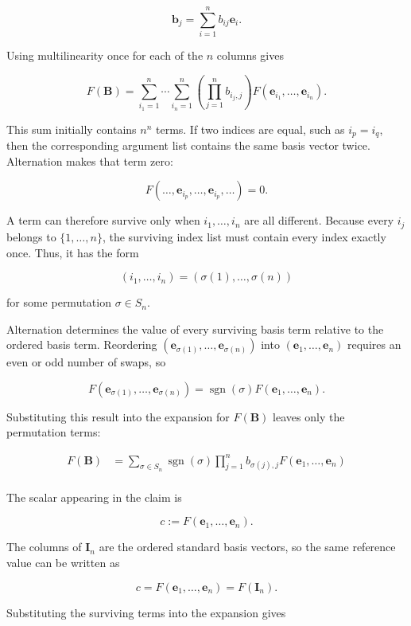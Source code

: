 \documentclass[
  australian,
  12pt,
  letterpaper,
  DIV=11,
  numbers=noendperiod,
  twoside]{scrreprt}
\begin{document}
\[
\mathbf b_j=\sum_{i=1}^{n}b_{ij}\mathbf e_i.
\]

Using multilinearity once for each of the \(n\) columns gives

\[
F(\mathbf B)
=
\sum_{i_1=1}^{n}\cdots\sum_{i_n=1}^{n}
\left(\prod_{j=1}^{n}b_{i_j,j}\right)
F(\mathbf e_{i_1},\ldots,\mathbf e_{i_n}).
\]

This sum initially contains \(n^n\) terms. If two indices are equal,
such as \(i_p=i_q\), then the corresponding argument list contains the
same basis vector twice. Alternation makes that term zero:

\[
F(\ldots,\mathbf e_{i_p},\ldots,\mathbf e_{i_p},\ldots)=0.
\]

A term can therefore survive only when \(i_1,\ldots,i_n\) are all
different. Because every \(i_j\) belongs to \(\{1,\ldots,n\}\), the
surviving index list must contain every index exactly once. Thus, it has
the form

\[
(i_1,\ldots,i_n)=(\sigma(1),\ldots,\sigma(n))
\]

for some permutation \(\sigma\in S_n\).

Alternation determines the value of every surviving basis term relative
to the ordered basis term. Reordering
\((\mathbf e_{\sigma(1)},\ldots,\mathbf e_{\sigma(n)})\) into
\((\mathbf e_1,\ldots,\mathbf e_n)\) requires an even or odd number of
swaps, so

\[
F(\mathbf e_{\sigma(1)},\ldots,\mathbf e_{\sigma(n)})
=
\operatorname{sgn}(\sigma)
F(\mathbf e_1,\ldots,\mathbf e_n).
\]

Substituting this result into the expansion for \(F(\mathbf B)\) leaves
only the permutation terms:

\[
\begin{aligned}
F(\mathbf B)
&=\sum_{\sigma\in S_n}
\operatorname{sgn}(\sigma)
\prod_{j=1}^{n}b_{\sigma(j),j}  F(\mathbf e_1,\ldots,\mathbf e_n)\\
\end{aligned}
\]

The scalar appearing in the claim is

\[
c\mathrel{:=}F(\mathbf e_1,\ldots,\mathbf e_n).
\]

The columns of \(\mathbf I_n\) are the ordered standard basis vectors,
so the same reference value can be written as

\[
c=F(\mathbf e_1,\ldots,\mathbf e_n)=F(\mathbf I_n).
\]

Substituting the surviving terms into the expansion gives
\end{document}
